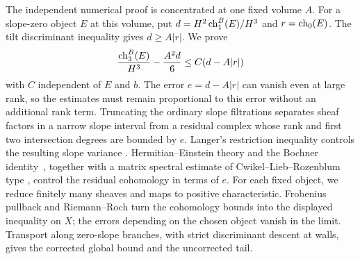 The independent numerical proof is concentrated at one fixed volume $A$.
For a slope-zero object $E$ at this volume, put
$d=H^2\operatorname{ch}_1^B(E)/H^3$ and $r=\operatorname{ch}_0(E)$. The tilt discriminant
inequality gives $d\geq A|r|$. We prove
\[
 \frac{\operatorname{ch}_3^B(E)}{H^3}-\frac{A^2d}{6}\le C(d-A|r|)
\]
with $C$ independent of $E$ and $b$. The error $e=d-A|r|$ can vanish
even at large rank, so the estimates must remain proportional to this
error without an additional rank term. Truncating the ordinary slope
filtrations separates sheaf factors in a narrow slope interval from a
residual complex whose rank and first two intersection degrees are
bounded by $e$.
Langer's restriction inequality controls the resulting slope variance
\cite{Langer2004,Langer2004Addendum}. Hermitian--Einstein theory and the
Bochner identity~\cite{Donaldson1985,UhlenbeckYau1986,DemaillyCADG},
together with a matrix spectral estimate of Cwikel--Lieb--Rozenblum type
\cite{Frank2014}, control the residual cohomology in terms of $e$.
For each fixed object, we reduce finitely many
sheaves and maps to positive characteristic. Frobenius pullback and
Riemann--Roch turn the cohomology bounds into the displayed inequality
on $X$; the errors depending on the chosen object vanish in the limit.
Transport along zero-slope branches, with strict discriminant descent at
walls, gives the corrected global bound and the uncorrected tail.

